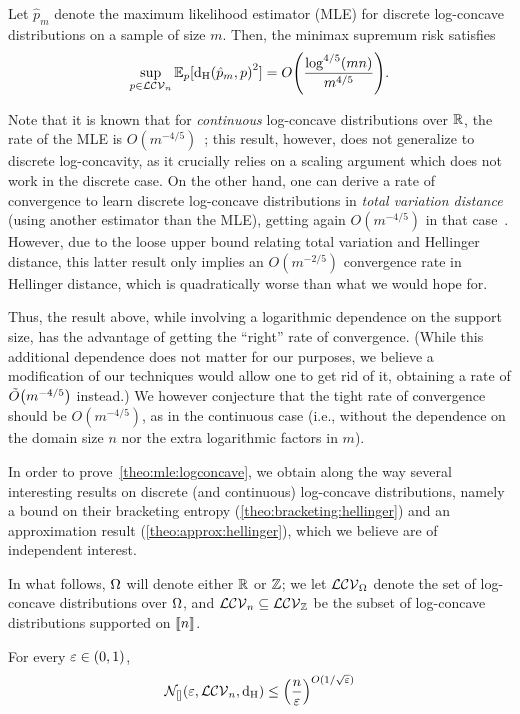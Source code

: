 \begin{theorem}\label{theo:mle:logconcave}
Let $\hat{p}_m$ denote the maximum likelihood estimator (MLE) for discrete log-concave distributions on a sample of size $m$. Then, the minimax supremum risk satisfies
\[
    \sup_{p\in\classlogconcave[n]}\shortexpect_p[ \hellinger{\hat{p}_m}{p}^2 ] = \bigO{ \frac{\log^{4/5} (mn)}{m^{4/5}} }.
\]
\end{theorem}

Note that it is known that for \emph{continuous} log-concave distributions over $\R$, the rate of the MLE is $O(m^{-4/5})$~\cite{KS:16}; this result, however, does not generalize to discrete log-concavity, as it crucially relies on a scaling argument which does not work in the discrete case. On the other hand, one can derive a rate of convergence to learn discrete log-concave distributions in \emph{total variation distance} (using another estimator than the MLE), getting again $O(m^{-4/5})$ in that case~\cite{DKS:16}. However, due to the loose upper bound relating total variation and Hellinger distance, this latter result only implies an $O(m^{-2/5})$ convergence rate in Hellinger distance, which is quadratically worse than what we would hope for.

Thus, the result above, while involving a logarithmic dependence on the support size, has the advantage of getting the ``right'' rate of convergence. (While this additional dependence does not matter for our purposes, we believe a modification of our techniques would allow one to get rid of it, obtaining a rate of $\tildeO{m^{-4/5}}$ instead.) We however conjecture that the tight rate of convergence should be $O(m^{-4/5})$, as in the continuous case (i.e., without the dependence on the domain size $n$ nor the extra logarithmic factors in $m$).

In order to prove~\cref{theo:mle:logconcave}, we obtain along the way several interesting results on discrete (and continuous) log-concave distributions, namely a bound on their bracketing entropy (\cref{theo:bracketing:hellinger}) and an approximation result (\cref{theo:approx:hellinger}), which we believe are of independent interest.\medskip

In what follows, $\domain$ will denote either $\R$ or $\Z$; we let $\classlogconcave[\domain]$ denote the set of log-concave distributions over $\domain$, and $\classlogconcave[n]\subseteq \classlogconcave[\Z]$ be the subset of log-concave distributions supported on $\modulo{n}$.
\begin{theorem}\label{theo:bracketing:hellinger}
  For every $\eps\in(0,1)$,
  \[
      \bracketing{\eps}{\classlogconcave[n]} \leq \left(\frac{n}{\eps}\right)^{O(1/\sqrt{\eps})}
  \]  
\end{theorem}

